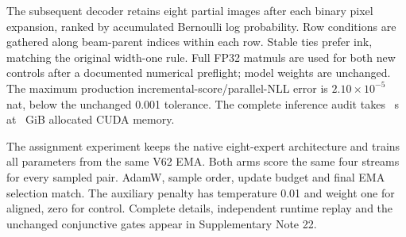 The subsequent decoder retains eight partial images after each binary pixel
expansion, ranked by accumulated Bernoulli log probability. Row conditions are
gathered along beam-parent indices within each row. Stable ties prefer ink,
matching the original width-one rule. Full FP32 matmuls are used for both new
controls after a documented numerical preflight; model weights are unchanged.
The maximum production incremental-score/parallel-NLL error is
$2.10\times10^{-5}$ nat, below the unchanged 0.001 tolerance. The complete
inference audit takes \BeamSeconds\ s at \BeamMemory\ GiB allocated CUDA memory.

The assignment experiment keeps the native eight-expert architecture and
trains all parameters from the same V62 EMA. Both arms score the same four
streams for every sampled pair. AdamW, sample order, update budget and final
EMA selection match. The auxiliary penalty has temperature 0.01 and weight
one for aligned, zero for control. Complete details, independent runtime
replay and the unchanged conjunctive gates appear in Supplementary Note 22.

